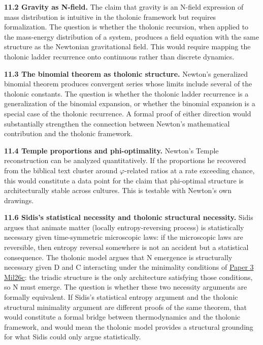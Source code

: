 \documentclass[
  11pt,
  letterpaper,
]{article}
\begin{document}
\textbf{11.2 Gravity as N-field.} The claim that gravity is an N-field
expression of mass distribution is intuitive in the tholonic framework
but requires formalization. The question is whether the tholonic
recursion, when applied to the mass-energy distribution of a system,
produces a field equation with the same structure as the Newtonian
gravitational field. This would require mapping the tholonic ladder
recurrence onto continuous rather than discrete dynamics.

\textbf{11.3 The binomial theorem as tholonic structure.} Newton's
generalized binomial theorem produces convergent series whose limits
include several of the tholonic constants. The question is whether the
tholonic ladder recurrence is a generalization of the binomial
expansion, or whether the binomial expansion is a special case of the
tholonic recurrence. A formal proof of either direction would
substantially strengthen the connection between Newton's mathematical
contribution and the tholonic framework.

\textbf{11.4 Temple proportions and phi-optimality.} Newton's Temple
reconstruction can be analyzed quantitatively. If the proportions he
recovered from the biblical text cluster around \(\varphi\)-related
ratios at a rate exceeding chance, this would constitute a data point
for the claim that phi-optimal structure is architecturally stable
across cultures. This is testable with Newton's own drawings.

\textbf{11.6 Sidis's statistical necessity and tholonic structural
necessity.} Sidis argues that animate matter (locally entropy-reversing
process) is statistically necessary given time-symmetric microscopic
laws: if the microscopic laws are reversible, then entropy reversal
somewhere is not an accident but a statistical consequence. The tholonic
model argues that N emergence is structurally necessary given D and C
interacting under the minimality conditions of
\href{https://github.com/baardev/truevalue/blob/main/docnav/Research/papers/3_minimal-recursive-triadic-framework/3_minimal-recursive-triadic-framework.pdf}{Paper
3}
\href{https://github.com/baardev/truevalue/blob/main/docnav/Research/papers/3_minimal-recursive-triadic-framework/3_minimal-recursive-triadic-framework.pdf}{Mil26c}:
the triadic structure is the only architecture satisfying those
conditions, so N must emerge. The question is whether these two
necessity arguments are formally equivalent. If Sidis's statistical
entropy argument and the tholonic structural minimality argument are
different proofs of the same theorem, that would constitute a formal
bridge between thermodynamics and the tholonic framework, and would mean
the tholonic model provides a structural grounding for what Sidis could
only argue statistically.
\end{document}
